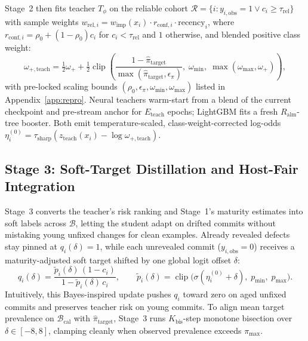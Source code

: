 \documentclass[pdflatex,sn-basic]{sn-jnl}
\theoremstyle{definition}
\theoremstyle{plain}
\begin{document}
Stage~2 then fits teacher $T_\phi$ on the reliable cohort $\mathcal{R} = \{i : y_{i,\text{obs}} = 1 \vee c_i \ge \tau_{\text{rel}}\}$ with sample weights $w_{\text{rel},i} = w_{\text{imp}}(x_i) \cdot r_{\text{conf},i} \cdot \text{recency}_i$, where $r_{\text{conf},i} = \rho_0 + (1 - \rho_0)c_i$ for $c_i < \tau_{\text{rel}}$ and $1$ otherwise, and blended positive class weight:
\begin{equation}
  \omega_{+,\text{teach}} = \tfrac{1}{2}\omega_+ + \tfrac{1}{2}\operatorname{clip}\!\left(\frac{1 - \hat{\pi}_{\text{target}}}{\max(\hat{\pi}_{\text{target}}, \epsilon_\pi)},\; \omega_{\min},\; \max(\omega_{\max}, \omega_+)\right),
  \label{eq:teacher_weights}
\end{equation}
with pre-locked scaling bounds $(\rho_0, \epsilon_\pi, \omega_{\min}, \omega_{\max})$ listed in Appendix~\ref{app:repro}. Neural teachers warm-start from a blend of the current checkpoint and pre-stream anchor for $E_{\text{teach}}$ epochs; LightGBM fits a fresh $R_{\text{alm}}$-tree booster. Both emit temperature-scaled, class-weight-corrected log-odds $\eta_i^{(0)} = \tau_{\text{sharp}}(z_{\text{teach}}(x_i) - \log \omega_{+,\text{teach}})$.

\subsection{Stage 3: Soft-Target Distillation and Host-Fair Integration}
\label{sec:stage3}

Stage~3 converts the teacher's risk ranking and Stage~1's maturity estimates into soft labels across $\mathcal{B}$, letting the student adapt on drifted commits without mistaking young unfixed changes for clean examples. Already revealed defects stay pinned at $q_i(\delta) = 1$, while each unrevealed commit ($y_{i,\text{obs}} = 0$) receives a maturity-adjusted soft target shifted by one global logit offset $\delta$:
\begin{equation}
  q_i(\delta) = \frac{\tilde{p}_i(\delta)\,(1 - c_i)}{1 - \tilde{p}_i(\delta)\,c_i}, \qquad \tilde{p}_i(\delta) = \operatorname{clip}\!\big(\sigma(\eta_i^{(0)} + \delta),\; p_{\min},\; p_{\max}\big).
  \label{eq:bayes_pu}
\end{equation}
Intuitively, this Bayes-inspired update pushes $q_i$ toward zero on aged unfixed commits and preserves teacher risk on young commits. To align mean target prevalence on $\mathcal{B}_{\text{cal}}$ with $\hat{\pi}_{\text{target}}$, Stage~3 runs $K_{\text{bis}}$-step monotone bisection over $\delta \in [-8, 8]$, clamping cleanly when observed prevalence exceeds $\pi_{\max}$.
\end{document}
